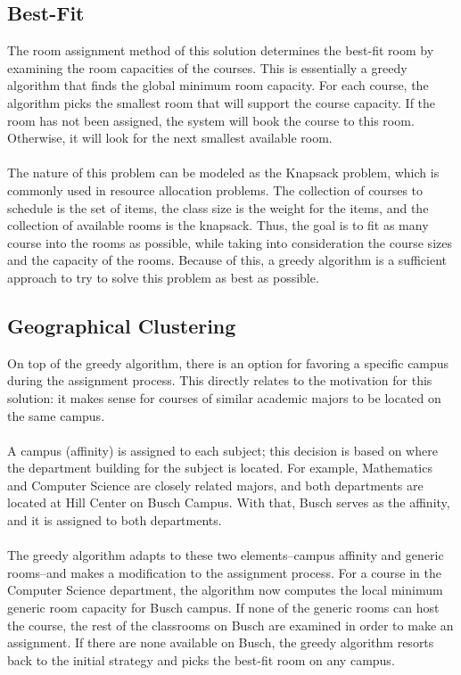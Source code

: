 \documentclass[12pt]{article}
\begin{document}
\subsection{Best-Fit}
The room assignment method of this solution determines the best-fit room by examining the room capacities of the courses. This is essentially a greedy algorithm that finds the global minimum room capacity. For each course, the algorithm picks the smallest room that will support the course capacity. If the room has not been assigned, the system will book the course to this room. Otherwise, it will look for the next smallest available room.
\\\\
The nature of this problem can be modeled as the Knapsack problem, which is commonly used in resource allocation problems. The collection of courses to schedule is the set of items, the class size is the weight for the items, and the collection of available rooms is the knapsack. Thus, the goal is to fit as many course into the rooms as possible, while taking into consideration the course sizes and the capacity of the rooms. Because of this, a greedy algorithm is a sufficient approach to try to solve this problem as best as possible.

\subsection{Geographical Clustering}
On top of the greedy algorithm, there is an option for favoring a specific campus during the assignment process. This directly relates to the motivation for this solution: it makes sense for courses of similar academic majors to be located on the same campus. 
\\\\
A campus (affinity) is assigned to each subject; this decision is based on where the department building for the subject is located. For example, Mathematics and Computer Science are closely related majors, and both departments are located at Hill Center on Busch Campus. With that, Busch serves as the affinity, and it is assigned to both departments.
\\\\
The greedy algorithm adapts to these two elements--campus affinity and generic rooms--and makes a modification to the assignment process. For a course in the Computer Science department, the algorithm now computes the local minimum generic room capacity for Busch campus. If none of the generic rooms can host the course, the rest of the classrooms on Busch are examined in order to make an assignment. If there are none available on Busch, the greedy algorithm resorts back to the initial strategy and picks the best-fit room on any campus.
\end{document}
